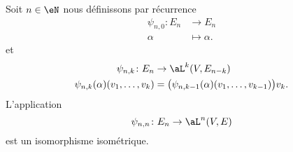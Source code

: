\begin{lemma}
	Soit \( n\in \eN\) nous définissons par récurrence
	\begin{equation}
		\begin{aligned}
			\psi_{n,0}\colon E_n & \to E_n         \\
			\alpha               & \mapsto \alpha.
		\end{aligned}
	\end{equation}
	et
	\begin{equation}
		\begin{aligned}
			\psi_{n,k}\colon E_n                & \to \aL^k(V,E_{n-k})                                       \\
			\psi_{n,k}(\alpha)(v_1,\ldots, v_k) & =\big( \psi_{n,k-1}(\alpha)(v_1,\ldots, v_{k-1}) \big)v_k.
		\end{aligned}
	\end{equation}
	L'application
	\begin{equation}
		\psi_{n,n}\colon E_n\to \aL^n(V,E)
	\end{equation}
	est un isomorphisme isométrique.
\end{lemma}

